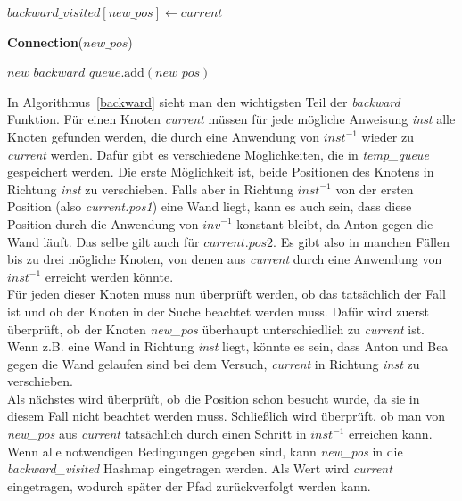 \documentclass[a4paper,10pt,ngerman]{scrartcl}
\begin{document}
\begin{algorithm}[H]
\begin{algorithmic}[1]
                        \State $\textit{backward\_visited}[\textit{new\_pos}] \gets \textit{current}$

                            \State \Return \textbf{Connection}($\textit{new\_pos}$)
                        \EndIf

                        \State $\textit{new\_backward\_queue}.\text{add}(\textit{new\_pos})$
                    \EndFor
                \EndFor
            \EndFunction
        \end{algorithmic}
    \end{algorithm}
    In Algorithmus~\ref{backward} sieht man den wichtigsten Teil der \textit{backward} Funktion. Für einen Knoten \textit{current} müssen für jede mögliche Anweisung \textit{inst} alle Knoten gefunden werden, die durch eine Anwendung von $\textit{inst}^{-1}$ wieder zu \textit{current} werden. Dafür gibt es verschiedene Möglichkeiten, die in \textit{temp\_queue} gespeichert werden. Die erste Möglichkeit ist, beide Positionen des Knotens in Richtung \textit{inst} zu verschieben. Falls aber in Richtung $\textit{inst}^{-1}$ von der ersten Position (also \textit{current.pos1}) eine Wand liegt, kann es auch sein, dass diese Position durch die Anwendung von $\textit{inv}^{-1}$ konstant bleibt, da Anton gegen die Wand läuft. Das selbe gilt auch für $\textit{current.pos2}$. Es gibt also in manchen Fällen bis zu drei mögliche Knoten, von denen aus \textit{current} durch eine Anwendung von $\textit{inst}^{-1}$ erreicht werden könnte. \\
    Für jeden dieser Knoten muss nun überprüft werden, ob das tatsächlich der Fall ist und ob der Knoten in der Suche beachtet werden muss. Dafür wird zuerst überprüft, ob der Knoten \textit{new\_pos} überhaupt unterschiedlich zu \textit{current} ist. Wenn z.B. eine Wand in Richtung \textit{inst} liegt, könnte es sein, dass Anton und Bea gegen die Wand gelaufen sind bei dem Versuch, \textit{current} in Richtung \textit{inst} zu verschieben. \\
    Als nächstes wird überprüft, ob die Position schon besucht wurde, da sie in diesem Fall nicht beachtet werden muss. Schließlich wird überprüft, ob man von \textit{new\_pos} aus \textit{current} tatsächlich durch einen Schritt in $\textit{inst}^{-1}$ erreichen kann.\\
    Wenn alle notwendigen Bedingungen gegeben sind, kann \textit{new\_pos} in die \textit{backward\_visited} Hashmap eingetragen werden. Als Wert wird \textit{current} eingetragen, wodurch später der Pfad zurückverfolgt werden kann. \\
\end{document}

